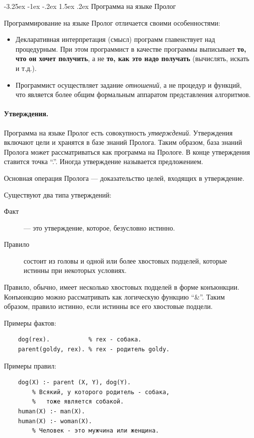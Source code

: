 \documentclass[12pt, openany, twoside]{book} %
\makeatletter
\renewcommand\section{\@startsection {section}{1}{\z@}%
                                   {-3.25ex \@plus -1ex \@minus -.2ex}%
                                   {1.5ex \@plus.2ex}%
                                   {\normalfont\large\bfseries}}
\makeatother
\begin{document}
\section{Программа на языке Пролог}

Программирование на языке Пролог отличается своими особенностями:
\begin{itemize}
\item Декларативная интерпретация (смысл) программ главенствует над процедурным. При этом  программист в качестве программы выписывает {\bf то, что он хочет получить}, а не  {\bf то, как это надо получать} (вычислять, искать и т.д.).
\item Программист осуществляет задание \emph{отношений}, а не {процедур и функций}, что является более общим формальным аппаратом представления алгоритмов.
\end{itemize}

\paragraph{Утверждения.} Программа на языке Пролог есть совокупность \emph{ут\-вер\-жде\-ний}. Утверждения включают цели и хранятся в базе знаний Пролога. Таким образом, база знаний Пролога может рассматриваться как программа на Прологе. В конце утверждения ставится точка ``.''. Иногда утверждение называется предложением.

Основная операция Пролога --- доказательство целей, входящих в утверждение.

Существуют два типа утверждений:
\begin{description}
\item[Факт] --- это утверждение, которое, безусловно истинно.
\item[Правило] состоит из головы и одной или более хвостовых подцелей, которые истинны при некоторых условиях.
\end{description}

Правило, обычно, имеет несколько хвостовых подцелей в форме конъюнкции. Конъюнкцию можно рассматривать как логическую функцию ``\&''. Таким образом, правило истинно, если истинны все его хвостовые подцели.

Примеры фактов:
{\tt\begin{verbatim}
    dog(rex).           % rex - собака.
    parent(goldy, rex). % rex - родитель goldy.
\end{verbatim}}

Примеры правил:
{\tt\begin{verbatim}
    dog(X) :- parent (X, Y), dog(Y).
        % Всякий, у которого родитель - собака,
        %   тоже является собакой.
    human(Х) :- man(Х).
    human(Х) :- woman(Х).
        % Человек - это мужчина или женщина.
\end{verbatim}}
\end{document}
